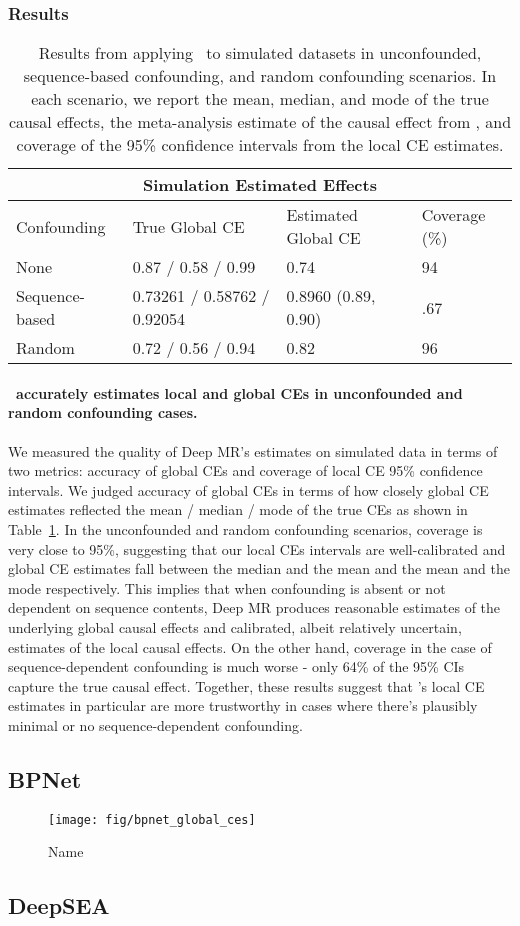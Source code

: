 \subsubsection{Results}%
\label{ssub:sim_results}
\begin{table}
    \begin{tabular}{ |p{3cm}||p{5cm}|p{5cm}|p{3cm}| }
     \hline
     \multicolumn{4}{|c|}{Simulation Estimated Effects} \\
     \hline
     Confounding & True Global CE & Estimated Global CE & Coverage (\%) \\
     \hline
     None & 0.87 / 0.58 / 0.99 & 0.74 & 94   \\
     \hline
     Sequence-based & 0.73261 / 0.58762 / 0.92054 & 0.8960 (0.89, 0.90) &  .67 \\
     \hline
     Random & 0.72 / 0.56 / 0.94 & 0.82 & 96 \\
     \hline
    \end{tabular}
    \caption{Results from applying \method\ to simulated datasets in unconfounded, sequence-based confounding, and random confounding scenarios. In each scenario, we report the mean, median, and mode of the true causal effects, the meta-analysis estimate of the causal effect from \method, and coverage of the 95\% confidence intervals from the local CE estimates.}
    \label{tab:sim_results}

\end{table}

\paragraph{\method\ accurately estimates local and global CEs in unconfounded and random confounding cases.}%
\label{par:sim_res_1}
We measured the quality of Deep MR's estimates on simulated data in terms of two metrics: accuracy of global CEs and coverage of local CE 95\% confidence intervals. We judged accuracy of global CEs in terms of how closely global CE estimates reflected the mean / median / mode of the true CEs as shown in Table~\ref{tab:sim_results}. In the unconfounded and random confounding scenarios, coverage is very close to 95\%, suggesting that our local CEs intervals are well-calibrated and global CE estimates fall between the median and the mean and the mean and the mode respectively. This implies that when confounding is absent or not dependent on sequence contents, Deep MR produces reasonable estimates of the underlying global causal effects and calibrated, albeit relatively uncertain, estimates of the local causal effects. On the other hand, coverage in the case of sequence-dependent confounding is much worse - only 64\% of the 95\% CIs capture the true causal effect. Together, these results suggest that \method's local CE estimates in particular are more trustworthy in cases where there's plausibly minimal or no sequence-dependent confounding.

\subsection{BPNet}
\begin{figure}[htpb]
	\centering
	\texttt{[image: fig/bpnet\_global\_ces]}
	\caption{Name}%
	\label{fig:bpnet_global_ces}
\end{figure}

\subsection{DeepSEA}


